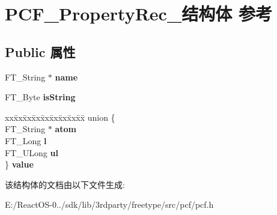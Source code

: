\hypertarget{struct_p_c_f___property_rec__}{}\section{P\+C\+F\+\_\+\+Property\+Rec\+\_\+结构体 参考}
\label{struct_p_c_f___property_rec__}
\subsection*{Public 属性}
\begin{DoxyCompactItemize}
\item 
\mbox{\label{struct_p_c_f___property_rec___aa5a3016c8149cbe48b246ffd670c3f5b}} 
F\+T\+\_\+\+String $\ast$ {\bfseries name}
\item 
\mbox{\label{struct_p_c_f___property_rec___aa68a1298c3f359638fce955bf6662ee0}} 
F\+T\+\_\+\+Byte {\bfseries is\+String}
\item 
\mbox{\label{struct_p_c_f___property_rec___ad66d558be4a818826198a534354de326}} 
\begin{tabbing}
xx\=xx\=xx\=xx\=xx\=xx\=xx\=xx\=xx\=\kill
union \{\\
\>FT\_String $\ast$ {\bfseries atom}\\
\>FT\_Long {\bfseries l}\\
\>FT\_ULong {\bfseries ul}\\
\} {\bfseries value}\\

\end{tabbing}\end{DoxyCompactItemize}


该结构体的文档由以下文件生成\+:\begin{DoxyCompactItemize}
\item 
E\+:/\+React\+O\+S-\/0../sdk/lib/3rdparty/freetype/src/pcf/pcf.\+h\end{DoxyCompactItemize}
